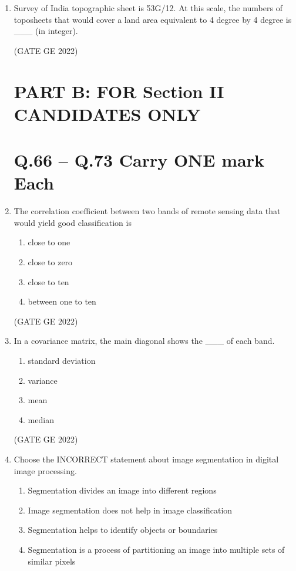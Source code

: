 \documentclass[a4paper, 11pt]{article}
\begin{document}
\begin{enumerate}
\item Survey of India topographic sheet is 53G/12. At this scale, the numbers of toposheets that would cover a land area equivalent to 4 degree by 4 degree is \_\_\_ (in integer).

\hfill (GATE GE 2022)

\section{\textbf{PART B: FOR Section II CANDIDATES ONLY }}
\section{\textbf{Q.66 – Q.73 Carry ONE mark Each}}

\item The correlation coefficient between two bands of remote sensing data that would yield good classification is
\begin{enumerate}
    \item close to one
    \item close to zero
    \item close to ten
    \item between one to ten
\end{enumerate}

\hfill (GATE GE 2022)

\item In a covariance matrix, the main diagonal shows the \_\_\_ of each band.
\begin{enumerate}
    \item standard deviation
    \item variance
    \item mean
    \item median
\end{enumerate}

\hfill (GATE GE 2022)

\item Choose the INCORRECT statement about image segmentation in digital image processing.
\begin{enumerate}
    \item Segmentation divides an image into different regions
    \item Image segmentation does not help in image classification
    \item Segmentation helps to identify objects or boundaries
    \item Segmentation is a process of partitioning an image into multiple sets of similar pixels
\end{enumerate}


\end{enumerate}
\end{document}
